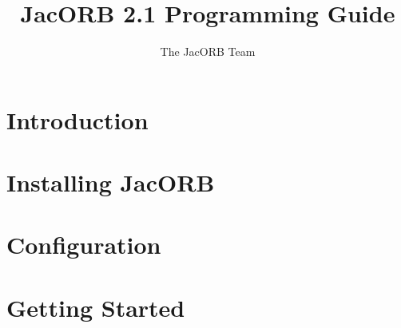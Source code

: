 \documentclass[12pt]{scrbook}
\title{JacORB 2.1 Programming Guide}
\author{The JacORB Team}
\begin{document}
\newcommand{\cmdline}[1]{\begin{small}\noindent \texttt{\$ #1}\end{small}}

\newcommand{\JacORBDir}{JacORB2\_1}
\newcommand{\JacORBVersion}{2.1}
\maketitle

\setlength{\parskip}{1.1ex}
\newpage
\tableofcontents


\chapter{Introduction}
\label{ch:intro}




\chapter{Installing JacORB}
\label{ch:installing}




\chapter{Configuration}
\label{ch:configuration}




\chapter{Getting Started}
\label{ch:start}



\end{document}
